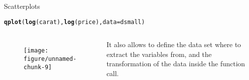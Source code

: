 \documentclass{beamer}\usepackage[]{graphicx}\usepackage[]{color}
\makeatletter
\def\maxwidth{ %
  \ifdim\Gin@nat@width>\linewidth
    \linewidth
  \else
    \Gin@nat@width
  \fi
}
\newcommand{\hlstd}[1]{\textcolor[rgb]{0.345,0.345,0.345}{#1}}%
\newcommand{\hlkwc}[1]{\textcolor[rgb]{0.333,0.667,0.333}{#1}}%
\newcommand{\hlkwd}[1]{\textcolor[rgb]{0.737,0.353,0.396}{\textbf{#1}}}%
\newenvironment{kframe}{%
 \def\at@end@of@kframe{}%
 \ifinner\ifhmode%
  \def\at@end@of@kframe{\end{minipage}}%
  \begin{minipage}{\columnwidth}%
 \fi\fi%
 \def\FrameCommand##1{\hskip\@totalleftmargin \hskip-\fboxsep
 \colorbox{shadecolor}{##1}\hskip-\fboxsep
     \hskip-\linewidth \hskip-\@totalleftmargin \hskip\columnwidth}%
 \MakeFramed {\advance\hsize-\width
   \@totalleftmargin\z@ \linewidth\hsize
   \@setminipage}}%
 {\par\unskip\endMakeFramed%
 \at@end@of@kframe}
\newenvironment{knitrout}{}{} %
\makeatother
\begin{document}
\begin{frame}[containsverbatim]{Scatterplots}
\begin{knitrout}\footnotesize
{}\color{fgcolor}\begin{kframe}
\begin{alltt}
\hlkwd{qplot}\hlstd{(}\hlkwd{log}\hlstd{(carat),} \hlkwd{log}\hlstd{(price),} \hlkwc{data} \hlstd{= dsmall)}
\end{alltt}
\end{kframe}
\end{knitrout}
\begin{columns}[t] 
\begin{minipage}{1\textwidth}
\begin{figure}[t]
\centering
\begin{knitrout}\footnotesize
{}\color{fgcolor}
\texttt{[image: figure/unnamed-chunk-9]} 

\end{knitrout}
\end{figure}
 \end{minipage}
\begin{minipage}{1\textwidth}
It also allows to define the data set where to extract the variables from, and the transformation of the data inside the function call.
\end{minipage}
\end{columns}
\end{frame}
\end{document}
